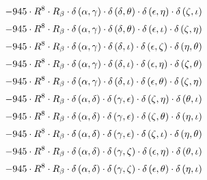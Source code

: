 \begin{subequations}
\begin{gather}
 \\[0.2em] \notag 		 - 945 \cdot R^{8} \cdot R_{\beta{}} \cdot \delta{}\left(\alpha{}, \gamma{}\right) \cdot \delta{}\left(\delta{}, \theta{}\right) \cdot \delta{}\left(\epsilon{}, \eta{}\right) \cdot \delta{}\left(\zeta{}, \iota{}\right) 
 \\[0.2em] \notag 		 - 945 \cdot R^{8} \cdot R_{\beta{}} \cdot \delta{}\left(\alpha{}, \gamma{}\right) \cdot \delta{}\left(\delta{}, \theta{}\right) \cdot \delta{}\left(\epsilon{}, \iota{}\right) \cdot \delta{}\left(\zeta{}, \eta{}\right) 
 \\[0.2em] \notag 		 - 945 \cdot R^{8} \cdot R_{\beta{}} \cdot \delta{}\left(\alpha{}, \gamma{}\right) \cdot \delta{}\left(\delta{}, \iota{}\right) \cdot \delta{}\left(\epsilon{}, \zeta{}\right) \cdot \delta{}\left(\eta{}, \theta{}\right) 
 \\[0.2em] \notag 		 - 945 \cdot R^{8} \cdot R_{\beta{}} \cdot \delta{}\left(\alpha{}, \gamma{}\right) \cdot \delta{}\left(\delta{}, \iota{}\right) \cdot \delta{}\left(\epsilon{}, \eta{}\right) \cdot \delta{}\left(\zeta{}, \theta{}\right) 
 \\[0.2em] \notag 		 - 945 \cdot R^{8} \cdot R_{\beta{}} \cdot \delta{}\left(\alpha{}, \gamma{}\right) \cdot \delta{}\left(\delta{}, \iota{}\right) \cdot \delta{}\left(\epsilon{}, \theta{}\right) \cdot \delta{}\left(\zeta{}, \eta{}\right) 
 \\[0.2em] \notag 		 - 945 \cdot R^{8} \cdot R_{\beta{}} \cdot \delta{}\left(\alpha{}, \delta{}\right) \cdot \delta{}\left(\gamma{}, \epsilon{}\right) \cdot \delta{}\left(\zeta{}, \eta{}\right) \cdot \delta{}\left(\theta{}, \iota{}\right) 
 \\[0.2em] \notag 		 - 945 \cdot R^{8} \cdot R_{\beta{}} \cdot \delta{}\left(\alpha{}, \delta{}\right) \cdot \delta{}\left(\gamma{}, \epsilon{}\right) \cdot \delta{}\left(\zeta{}, \theta{}\right) \cdot \delta{}\left(\eta{}, \iota{}\right) 
 \\[0.2em] \notag 		 - 945 \cdot R^{8} \cdot R_{\beta{}} \cdot \delta{}\left(\alpha{}, \delta{}\right) \cdot \delta{}\left(\gamma{}, \epsilon{}\right) \cdot \delta{}\left(\zeta{}, \iota{}\right) \cdot \delta{}\left(\eta{}, \theta{}\right) 
 \\[0.2em] \notag 		 - 945 \cdot R^{8} \cdot R_{\beta{}} \cdot \delta{}\left(\alpha{}, \delta{}\right) \cdot \delta{}\left(\gamma{}, \zeta{}\right) \cdot \delta{}\left(\epsilon{}, \eta{}\right) \cdot \delta{}\left(\theta{}, \iota{}\right) 
 \\[0.2em] \notag 		 - 945 \cdot R^{8} \cdot R_{\beta{}} \cdot \delta{}\left(\alpha{}, \delta{}\right) \cdot \delta{}\left(\gamma{}, \zeta{}\right) \cdot \delta{}\left(\epsilon{}, \theta{}\right) \cdot \delta{}\left(\eta{}, \iota{}\right) 

\end{gather}
\end{subequations}
